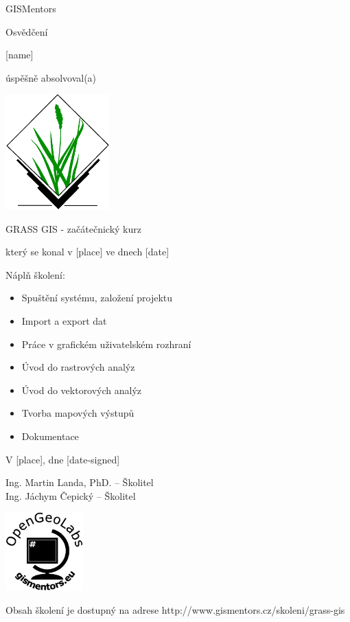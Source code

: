 \documentclass[12pt, a4paper]{letter}
\begin{document}
\pagestyle{empty}
\begin{center}

{\Large GISMentors}

{\Huge Osvědčení}

{\Large [name]}

úspěšně absolvoval(a)

\includegraphics[width=0.30\textwidth]{../images/grasslogo_vector.eps}

{\Large GRASS GIS - začátečnický kurz}

který se konal v [place] ve dnech [date]
\end{center}

Náplň školení:

\begin{itemize}
    \item Spuštění systému, založení projektu
    \item Import a export dat
    \item Práce v grafickém uživatelském rozhraní
    \item Úvod do rastrových analýz
    \item Úvod do vektorových analýz
    \item Tvorba mapových výstupů
    \item Dokumentace
\end{itemize}

\vfill
\parbox{7cm}{

    V [place], dne [date-signed]\\

\vfill

    Ing. Martin Landa, PhD. -- Školitel\\

\vfill
    Ing. Jáchym Čepický -- Školitel
}
\hfill
\parbox{3cm}{
    \includegraphics[width=3cm]{../images/placka.eps}
}

\vfill

\begin{center}
{\footnotesize Obsah školení je dostupný na adrese
http://www.gismentors.cz/skoleni/grass-gis}
\end{center}
\end{document}
